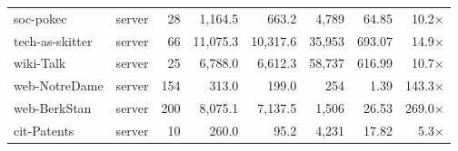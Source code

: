 \begin{tabular}{@{}llrrrrrr@{}}
soc-pokec & server & 28 & 1,164.5 & 663.2 & 4,789 & 64.85 & 10.2$\times$ \\
tech-as-skitter & server & 66 & 11,075.3 & 10,317.6 & 35,953 & 693.07 & 14.9$\times$ \\
wiki-Talk & server & 25 & 6,788.0 & 6,612.3 & 58,737 & 616.99 & 10.7$\times$ \\
web-NotreDame & server & 154 & 313.0 & 199.0 & 254 & 1.39 & 143.3$\times$ \\
web-BerkStan & server & 200 & 8,075.1 & 7,137.5 & 1,506 & 26.53 & 269.0$\times$ \\
cit-Patents & server & 10 & 260.0 & 95.2 & 4,231 & 17.82 & 5.3$\times$ \\
\bottomrule
\end{tabular}

